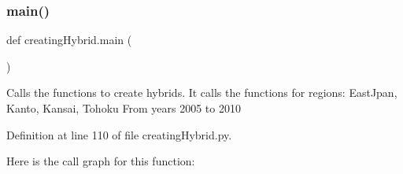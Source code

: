\subsubsection{\texorpdfstring{main()}{main()}}
{\footnotesize\ttfamily def creating\+Hybrid.\+main (\begin{DoxyParamCaption}{ }\end{DoxyParamCaption})}

\begin{DoxyVerb}Calls the functions to create hybrids.
It calls the functions for regions: EastJpan, Kanto, Kansai, Tohoku
From years 2005 to 2010
\end{DoxyVerb}
 

Definition at line 110 of file creating\+Hybrid.\+py.

Here is the call graph for this function\+:
